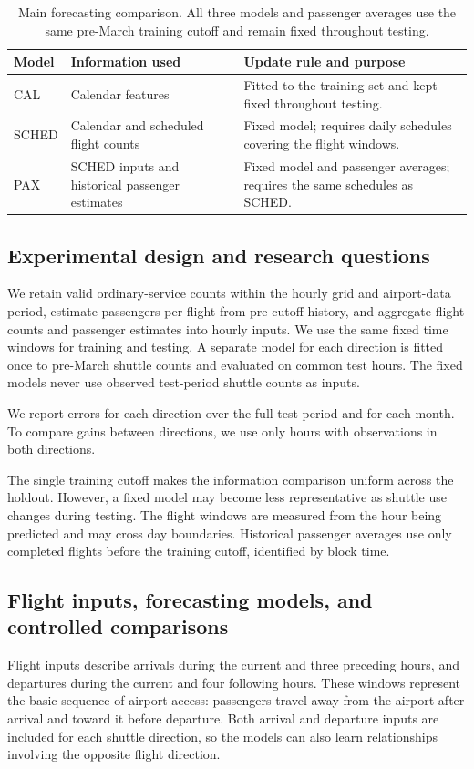\documentclass[preprint,12pt,times]{elsarticle}
\begin{document}
\begin{table}[t]
\centering\small
\caption{Main forecasting comparison. All three models and passenger averages use the same pre-March training cutoff and remain fixed throughout testing.}
\label{tab:information}
\begin{tabular}{p{}p{}p{}}\toprule
Model & Information used & Update rule and purpose\\\midrule
CAL & Calendar features & Fitted to the training set and kept fixed throughout testing.\\
SCHED & Calendar and scheduled flight counts & Fixed model; requires daily schedules covering the flight windows.\\
PAX & SCHED inputs and historical passenger estimates & Fixed model and passenger averages; requires the same schedules as SCHED.\\\bottomrule
\end{tabular}
\end{table}

\subsection{Experimental design and research questions}
We retain valid ordinary-service counts within the hourly grid and airport-data period, estimate passengers per flight from pre-cutoff history, and aggregate flight counts and passenger estimates into hourly inputs. We use the same fixed time windows for training and testing. A separate model for each direction is fitted once to pre-March shuttle counts and evaluated on common test hours. The fixed models never use observed test-period shuttle counts as inputs.

We report errors for each direction over the full test period and for each month. To compare gains between directions, we use only hours with observations in both directions.

The single training cutoff makes the information comparison uniform across the holdout. However, a fixed model may become less representative as shuttle use changes during testing. The flight windows are measured from the hour being predicted and may cross day boundaries. Historical passenger averages use only completed flights before the training cutoff, identified by block time.

\subsection{Flight inputs, forecasting models, and controlled comparisons}
Flight inputs describe arrivals during the current and three preceding hours, and departures during the current and four following hours. These windows represent the basic sequence of airport access: passengers travel away from the airport after arrival and toward it before departure. Both arrival and departure inputs are included for each shuttle direction, so the models can also learn relationships involving the opposite flight direction.
\end{document}
